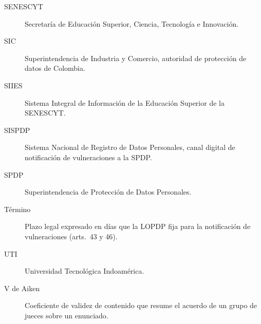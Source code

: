 \begin{description}
  \item[SENESCYT] Secretaría de Educación Superior, Ciencia, Tecnología e Innovación.
  \item[SIC] Superintendencia de Industria y Comercio, autoridad de protección de datos de Colombia.
  \item[SIIES] Sistema Integral de Información de la Educación Superior de la SENESCYT.
  \item[SISPDP] Sistema Nacional de Registro de Datos Personales, canal digital de notificación de vulneraciones a la SPDP.
  \item[SPDP] Superintendencia de Protección de Datos Personales.
  \item[Término] Plazo legal expresado en días que la LOPDP fija para la notificación de vulneraciones (arts.~43 y 46).
  \item[UTI] Universidad Tecnológica Indoamérica.
  \item[V de Aiken] Coeficiente de validez de contenido que resume el acuerdo de un grupo de jueces sobre un enunciado.
\end{description}
